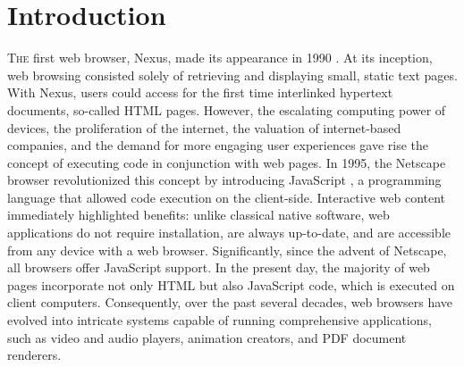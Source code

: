 
\chapter{Introduction}
\label{Intro}



\lettrine[lines=3]{T}{he} first web browser, Nexus, made its appearance in 1990 \cite{nexus}.  
At its inception, web browsing consisted solely of retrieving and displaying small, static text pages. 
With Nexus, users could access for the first time interlinked hypertext documents, so-called HTML pages. 
However, the escalating computing power of devices, the proliferation of the internet, the valuation of internet-based companies, and the demand for more engaging user experiences gave rise the concept of executing code in conjunction with web pages. 
In 1995, the Netscape browser revolutionized this concept by introducing JavaScript \cite{10.1007/978-3-642-14107-2_7}, a programming language that allowed code execution on the client-side.
Interactive web content immediately highlighted benefits: unlike classical native software, web applications do not require installation, are always up-to-date, and are accessible from any device with a web browser. 
Significantly, since the advent of Netscape, all browsers offer JavaScript support. 
In the present day, the majority of web pages incorporate not only HTML but also JavaScript code, which is executed on client computers. 
Consequently, over the past several decades, web browsers have evolved into intricate systems capable of running comprehensive applications, such as video and audio players, animation creators, and PDF document renderers.


